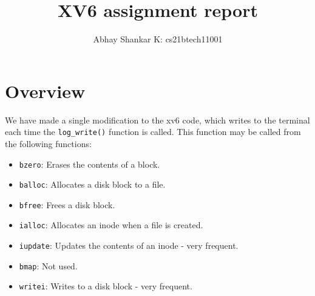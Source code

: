 \documentclass[9pt]{amsart}
\begin{document}
    \newcommand{\me}{
        \author{Abhay Shankar K: cs21btech11001}
        \maketitle
    }
    \title{XV6 assignment report}
    \me

    \section{Overview}

    We have made a single modification to the xv6 code, which writes to the terminal each time the \texttt{log\_write()} function is called. This function may be called from the following functions: 
    \begin{itemize}
        \item \texttt{bzero}: Erases the contents of a block.
        \item \texttt{balloc}: Allocates a disk block to a file.
        \item \texttt{bfree}: Frees a disk block.
        \item \texttt{ialloc}: Allocates an inode when a file is created.
        \item \texttt{iupdate}: Updates the contents of an inode - very frequent.
        \item \texttt{bmap}: Not used.
        \item \texttt{writei}: Writes to a disk block - very frequent.
    \end{itemize}
\end{document}
